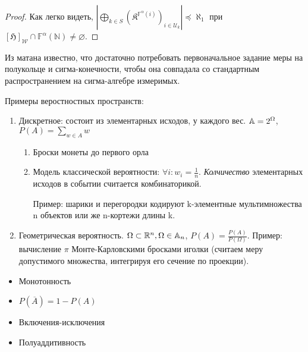 \documentclass[12pt, a4paper, oneside]{article}
\begin{document}
\begin{proof}
    Как легко видеть, $\left|\bigoplus_{k \in S}\left(\mathfrak{K}^{\mathbb{F}^\alpha(i)}\right)_{i \in \mathcal{U}_k}\right| \preccurlyeq \aleph_1$
    при $[\mathfrak{H}]_{\mathcal{W}} \cap \mathbb{F}^\alpha(\mathbb{N}) \neq \varnothing$.
\end{proof}

\begin{remark}
    Из матана известно, что достаточно потребовать первоначальное задание меры на полукольце
    и сигма-конечности, чтобы она совпадала со стандартным распространением на сигма-алгебре измеримых.
\end{remark}


\begin{example}
    Примеры веростностных пространств:

    \begin{enumerate}
        \item Дискретное: состоит из элементарных исходов, у каждого вес. ${\mathbb{A}} = 2^\Omega$, $P(A) = \sum_{w \in A} w$
        \begin{enumerate}
            \item Броски монеты до первого орла
            \item Модель классической вероятности: $\forall i: w_i = \frac{1}{n}$.
            \textit{Колчичество} элементарных исходов в событии считается комбинаторикой.

            Пример: шарики и перегородки кодируют k-элементные мультимножества n объектов или же n-кортежи длины k.
        \end{enumerate}

        \item Геометрическая вероятность. $\Omega \subset {\mathbb{R}}^n, \Omega \in {\mathbb{A}}_n$,
        $P(A) = \frac{P(A)}{P(\Omega)}$.
        Пример: вычисление $\pi$ Монте-Карловскими бросками иголки
        (считаем меру допустимого множества, интегрируя его сечение по проекции).
    \end{enumerate}
\end{example}


\begin{property}
    \begin{itemize}
        \item Монотонность
        \item $P(\overline{A}) = 1 - P(A)$
        \item Включения-исключения
        \item Полуаддитивность
    \end{itemize}
\end{property}
\end{document}
